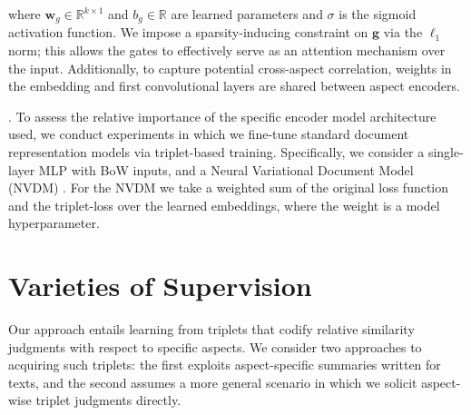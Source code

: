 \documentclass[11pt,a4paper]{article}
\begin{document}
\noindent where ${\mathbf w}_g \in \mathbb{R}^{k \times 1}$ and $b_g \in \mathbb{R}$ are learned parameters and $\sigma$ is the sigmoid activation function. We impose a sparsity-inducing constraint on $\mathbf{g}$ via the $\ell_1$ norm; this allows the gates to effectively serve as an attention mechanism over the input. Additionally, to capture potential cross-aspect correlation, weights in the embedding and first convolutional layers are shared between aspect encoders. 




\vspace{.2em}
. To assess the relative importance of the specific encoder model architecture used, we conduct experiments in which we fine-tune standard document representation models via triplet-based training. Specifically, we consider a single-layer MLP with BoW inputs, and a Neural Variational Document Model (NVDM) \cite{miao2016neural}. For the NVDM we take a weighted sum of the original loss function and the triplet-loss over the learned embeddings, where the weight is a model hyperparameter.



\section{Varieties of Supervision}
Our approach entails learning from triplets that codify relative similarity judgments with respect to specific aspects. We consider two approaches to acquiring such triplets: the first exploits aspect-specific summaries written for texts, and the second assumes a more general scenario in which we solicit aspect-wise triplet judgments directly.
\end{document}
